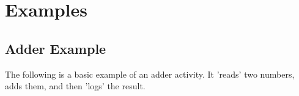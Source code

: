 \clearpage\section{Examples}

\subsection{Adder Example}

The following is a basic example of an adder activity.
It 'reads' two numbers, adds them, and then 'logs' the result.


